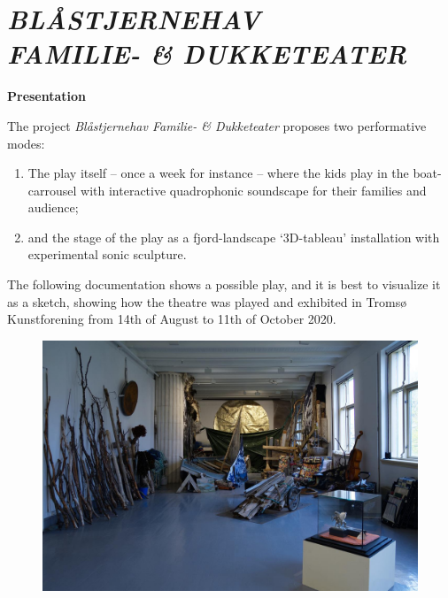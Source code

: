 

\chapter*{ \textsl{\textbf{BL\AA STJERNEHAV  \\ FAMILIE- \& DUKKETEATER}}}



\label{psh}

\vspace{1cm}

{\Large \textbf{Presentation}}

\bigskip
\bigskip

The project \textsl{Bl\aa stjernehav Familie- \& Dukketeater} proposes two performative modes: 
\begin{enumerate}
\item The play itself -- once a week for instance -- where the kids play in the boat-carrousel with interactive quadrophonic soundscape for their families and audience;
\item and the stage of the play as a fjord-landscape `3D-tableau' installation with experimental sonic sculpture.
\end{enumerate}

\bigskip

The following documentation shows a possible play, and it is best to visualize it as a sketch, showing how the theatre was played and exhibited in Troms\o{} Kunstforening from 14th of August to 11th of October 2020. 

\bigskip

\begin{figure}[h]
		\includegraphics[width=\textwidth]{mp/img/img1}
		\label{sh}
\end{figure}

